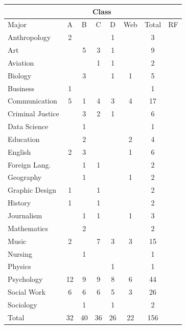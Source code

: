 \documentclass[11pt, chapterprefix=true]{scrbook}\usepackage[]{graphicx}\usepackage[]{color}
\begin{document}
\begin{exercises}
\begin{exercise}
\begin{minipage}[ht]{9cm}
{{%
\centering
\begin{tabular}{@{} l | cccccc | c @{}} \hline
& \multicolumn{5}{c}{Class } \\ \hline
Major & A & B & C & D & Web & Total & RF \\ \hline
Anthropology & 2 &   &   & 1 &   & 3 & \\
Art           &   & 5 & 3 & 1 &   & 9 & \\
Aviation      &   &   & 1 & 1 &   & 2 & \\
Biology       &   & 3 &   & 1 & 1 & 5 & \\
Business      & 1 &   &   &   &   & 1 & \\
Communication & 5 & 1 & 4 & 3 & 4 & 17 & \\
Criminal Justice &  & 3 & 2 & 1 &   & 6 & \\
Data Science  &   & 1 &   &   &   & 1 & \\
Education     &   & 2 &   &   & 2 & 4 & \\
English       & 2 & 3 &   &   & 1 & 6 & \\
Foreign Lang. &   & 1 & 1 &   &   & 2 & \\
Geography     &   & 1 &   &   & 1 & 2 & \\
Graphic Design & 1 &  & 1 &   &   & 2 & \\
History       & 1 &   & 1 &   &   & 2 & \\
Journalism    &   & 1 & 1 &   & 1 & 3 & \\
Mathematics   &   & 2 &   &   &   & 2 & \\
Music         & 2 &   & 7 & 3 & 3 & 15 & \\
Nursing       &   & 1 &   &   &   & 1 & \\
Physics       &   &   &   & 1 &   & 1 & \\
Psychology    &12 & 9 & 9 & 8 & 6 & 44 & \\
Social Work   & 6 & 6 & 6 & 5 & 3 & 26 & \\
Sociology      &   & 1 &   & 1 &   & 2 & \\ \hline
Total         &32 &40 &36 &26 &22 &156 &   \\ \hline
\end{tabular}
}}
\end{minipage}
\begin{minipage}[ht]{6cm}


\end{minipage}
\end{exercise}
\end{exercises}
\end{document}
